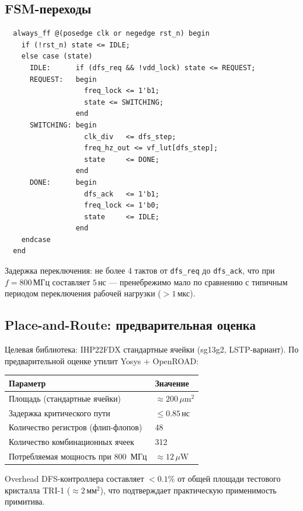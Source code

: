 \subsection{FSM-переходы}
\label{subsec:fsm-transitions}

\begin{verbatim}
  always_ff @(posedge clk or negedge rst_n) begin
    if (!rst_n) state <= IDLE;
    else case (state)
      IDLE:      if (dfs_req && !vdd_lock) state <= REQUEST;
      REQUEST:   begin
                   freq_lock <= 1'b1;
                   state <= SWITCHING;
                 end
      SWITCHING: begin
                   clk_div   <= dfs_step;
                   freq_hz_out <= vf_lut[dfs_step];
                   state     <= DONE;
                 end
      DONE:      begin
                   dfs_ack   <= 1'b1;
                   freq_lock <= 1'b0;
                   state     <= IDLE;
                 end
    endcase
  end
\end{verbatim}

Задержка переключения: не более 4 тактов от \texttt{dfs\_req}
до \texttt{dfs\_ack}, что при $f=800\,\text{МГц}$ составляет $5\,\text{нс}$ —
пренебрежимо мало по сравнению с типичным периодом переключения
рабочей нагрузки ($> 1\,\text{мкс}$).

\subsection{Place-and-Route: предварительная оценка}
\label{subsec:par-estimate}

Целевая библиотека: IHP22FDX стандартные ячейки (sg13g2, LSTP-вариант).
По предварительной оценке утилит Yosys + OpenROAD:
\begin{center}
\begin{tabular}{ll}
\hline
Параметр & Значение \\
\hline
Площадь (стандартные ячейки) & $\approx 200\,\mu\text{m}^2$ \\
Задержка критического пути  & $\leq 0{.}85\,\text{нс}$ \\
Количество регистров (флип-флопов) & 48 \\
Количество комбинационных ячеек & 312 \\
Потребляемая мощность при 800~МГц & $\approx 12\,\mu\text{W}$ \\
\hline
\end{tabular}
\end{center}

Overhead DFS-контроллера составляет $< 0{.}1\%$ от общей площади
тестового кристалла TRI-1 ($\approx 2\,\text{мм}^2$), что подтверждает
практическую применимость примитива.

